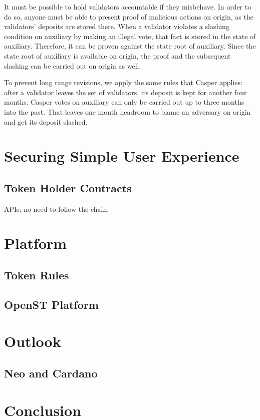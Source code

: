 \documentclass[12pt,a4paper]{article}
\begin{document}
It must be possible to hold validators accountable if they misbehave.
In order to do so, anyone must be able to present proof of malicious actions on origin,
as the validators' deposits are stored there.
When a validator violates a slashing condition on auxiliary by making an illegal vote,
that fact is stored in the state of auxiliary.
Therefore, it can be proven against the state root of auxiliary.
Since the state root of auxiliary is available on origin,
the proof and the subsequent slashing can be carried out on origin as well.

To prevent long range revisions, we apply the same rules that Casper applies:
after a validator leaves the set of validators, its deposit is kept for another four months.
Casper votes on auxiliary can only be carried out up to three months into the past.
That leaves one month headroom to blame an adversary on origin and get its deposit slashed.

%
%
\section{Securing Simple User Experience}

\subsection{Token Holder Contracts}

APIs; no need to follow the chain.

%
%
\section{Platform}

\subsection{Token Rules}

\subsection{OpenST Platform}

%
%
\section{Outlook}

\subsection{Neo and Cardano}

%
%
\section{Conclusion}



\end{document}
